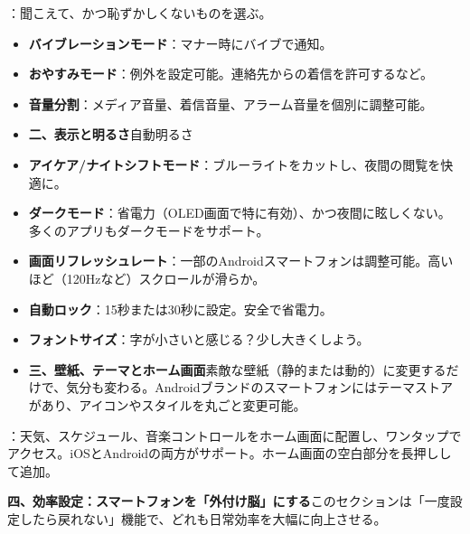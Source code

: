 


：聞こえて、かつ恥ずかしくないものを選ぶ。

\begin{itemize}
  \item \textbf{バイブレーションモード}：マナー時にバイブで通知。
  \item \textbf{おやすみモード}：例外を設定可能。連絡先からの着信を許可するなど。
  \item \textbf{音量分割}：メディア音量、着信音量、アラーム音量を個別に調整可能。
  \item \textbf{二、表示と明るさ}自動明るさ
\end{itemize}


\begin{itemize}
  \item \textbf{アイケア/ナイトシフトモード}：ブルーライトをカットし、夜間の閲覧を快適に。
  \item \textbf{ダークモード}：省電力（OLED画面で特に有効）、かつ夜間に眩しくない。多くのアプリもダークモードをサポート。
  \item \textbf{画面リフレッシュレート}：一部のAndroidスマートフォンは調整可能。高いほど（120Hzなど）スクロールが滑らか。
  \item \textbf{自動ロック}：15秒または30秒に設定。安全で省電力。
  \item \textbf{フォントサイズ}：字が小さいと感じる？少し大きくしよう。
  \item \textbf{三、壁紙、テーマとホーム画面}素敵な壁紙（静的または動的）に変更するだけで、気分も変わる。Androidブランドのスマートフォンにはテーマストアがあり、アイコンやスタイルを丸ごと変更可能。
\end{itemize}


：天気、スケジュール、音楽コントロールをホーム画面に配置し、ワンタップでアクセス。iOSとAndroidの両方がサポート。ホーム画面の空白部分を長押しして追加。

\textbf{四、効率設定：スマートフォンを「外付け脳」にする}このセクションは「一度設定したら戻れない」機能で、どれも日常効率を大幅に向上させる。

